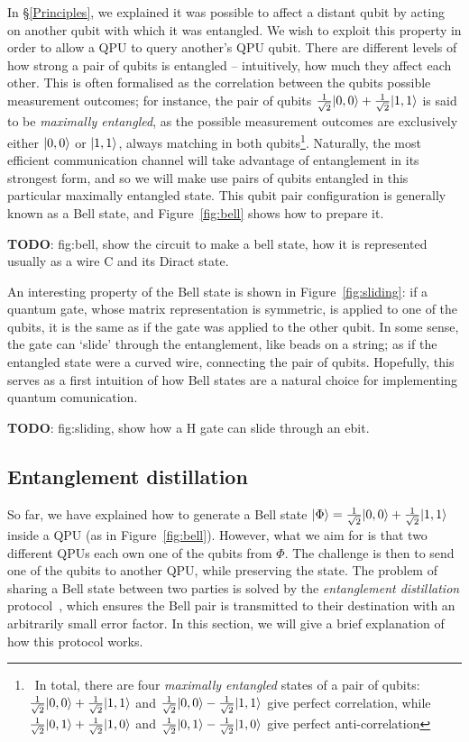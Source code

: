 In \S\ref{Principles}, we explained it was possible to affect a distant qubit by acting on another qubit with which it was entangled. We wish to exploit this property in order to allow a QPU to query another's QPU qubit. There are different levels of how strong a pair of qubits is entangled -- intuitively, how much they affect each other. This is often formalised as the correlation between the qubits possible measurement outcomes; for instance, the pair of qubits \(\frac{1}{\sqrt{2}}\vert 0,0 \rangle + \frac{1}{\sqrt{2}}\vert 1,1 \rangle\) is said to be \textit{maximally entangled}, as the possible measurement outcomes are exclusively either \(\vert 0,0 \rangle\) or \(\vert 1,1 \rangle\), always matching in both qubits\footnote{\, In total, there are four \textit{maximally entangled} states of a pair of qubits: \(\frac{1}{\sqrt{2}}\vert 0,0 \rangle + \frac{1}{\sqrt{2}}\vert 1,1 \rangle\) and \(\frac{1}{\sqrt{2}}\vert 0,0 \rangle - \frac{1}{\sqrt{2}}\vert 1,1 \rangle\) give perfect correlation, while \(\frac{1}{\sqrt{2}}\vert 0,1 \rangle + \frac{1}{\sqrt{2}}\vert 1,0 \rangle\) and \(\frac{1}{\sqrt{2}}\vert 0,1 \rangle - \frac{1}{\sqrt{2}}\vert 1,0 \rangle\) give perfect anti-correlation}. Naturally, the most efficient communication channel will take advantage of entanglement in its strongest form, and so we will make use pairs of qubits entangled in this particular maximally entangled state. This qubit pair configuration is generally known as a Bell state, and Figure~\ref{fig:bell} shows how to prepare it.

\textbf{TODO}: fig:bell, show the circuit to make a bell state, how it is represented usually as a wire C and its Diract state.

An interesting property of the Bell state is shown in Figure~\ref{fig:sliding}: if a quantum gate, whose matrix representation is symmetric, is applied to one of the qubits, it is the same as if the gate was applied to the other qubit. In some sense, the gate can `slide' through the entanglement, like beads on a string; as if the entangled state were a curved wire, connecting the pair of qubits. Hopefully, this serves as a first intuition of how Bell states are a natural choice for implementing quantum comunication.

\textbf{TODO}: fig:sliding, show how a H gate can slide through an ebit.

\subsection{Entanglement distillation}
\label{Distillation}

So far, we have explained how to generate a Bell state \(\vert \Phi \rangle = \frac{1}{\sqrt{2}}\vert 0,0 \rangle + \frac{1}{\sqrt{2}}\vert 1,1 \rangle\) inside a QPU (as in Figure~\ref{fig:bell}). However, what we aim for is that two different QPUs each own one of the qubits from \(\Phi\). The challenge is then to send one of the qubits to another QPU, while preserving the state. The problem of sharing a Bell state between two parties is solved by the \textit{entanglement distillation} protocol~\citep{DistillationProtocol}, which ensures the Bell pair is transmitted to their destination with an arbitrarily small error factor. In this section, we will give a brief explanation of how this protocol works.

